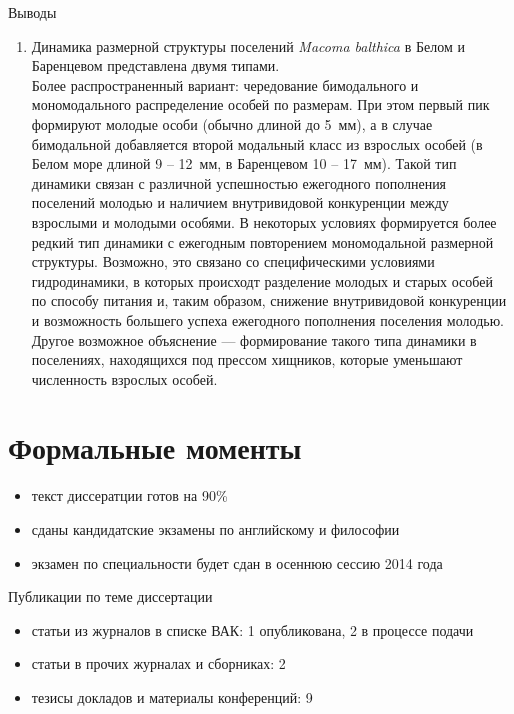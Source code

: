 \documentclass{beamer}
\begin{document}
\begin{small}
\begin{frame}{Выводы}
	\begin{enumerate}
\addtocounter{enumi}{10}
		\item Динамика размерной структуры поселений {\it Macoma balthica} в Белом и Баренцевом представлена двумя типами. \\
{\tiny Более распространенный вариант: чередование бимодального и мономодального распределение особей по размерам. При этом первый пик формируют молодые особи (обычно длиной до 5~мм), а в случае бимодальной добавляется второй модальный класс из взрослых особей (в Белом море длиной 9 -- 12~мм, в Баренцевом 10 -- 17~мм). Такой тип динамики связан с различной успешностью ежегодного пополнения поселений молодью и наличием внутривидовой конкуренции между взрослыми и молодыми особями.
В некоторых условиях формируется более редкий тип динамики с ежегодным повторением мономодальной размерной структуры. Возможно, это связано со специфическими условиями гидродинамики, в которых происходт разделение молодых и старых особей по способу питания и, таким образом, снижение внутривидовой конкуренции и возможность большего успеха ежегодного пополнения поселения молодью. Другое возможное объяснение --- формирование такого типа динамики в поселениях, находящихся под прессом хищников, которые уменьшают численность взрослых особей.}
	\end{enumerate}
\end{frame}

\end{small}

		\section*{Формальные моменты}
\begin{frame}{}
\begin{itemize}
	\item{текст диссератции готов на 90\%}
	\item{сданы кандидатские экзамены по английскому и философии}
	\item{экзамен по специальности будет сдан в осеннюю сессию 2014 года}
\end{itemize}
\end{frame}

\begin{frame}{Публикации по теме диссертации}
\begin{itemize}
	\item{статьи из журналов в списке ВАК: 1 опубликована, 2 в процессе подачи}
	\item{статьи в прочих журналах и сборниках: 2}
	\item{тезисы докладов и материалы конференций: 9}
\end{itemize}
\end{frame}
\end{document}
